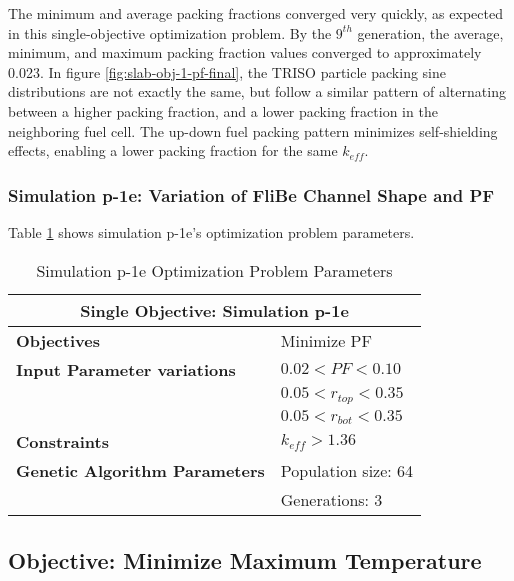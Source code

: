 The minimum and average packing fractions converged very quickly, as expected 
in this single-objective optimization problem.
By the $9^{th}$ generation, the average, minimum, and maximum packing fraction
values converged to approximately 0.023. 
In figure \ref{fig:slab-obj-1-pf-final}, the TRISO particle packing 
sine distributions are not exactly the same, but follow a similar pattern of 
alternating between a higher packing fraction, and a lower packing fraction 
in the neighboring fuel cell. 
The up-down fuel packing pattern minimizes self-shielding effects, enabling  
a lower packing fraction for the same $k_{eff}$. 

\subsubsection{Simulation p-1e: Variation of FliBe Channel Shape and PF}
Table \ref{tab:simulationp1e} shows simulation p-1e's optimization problem parameters. 
\begin{table}[htbp]
    \centering
    \onehalfspacing
    \caption{Simulation p-1e Optimization Problem Parameters}
	\label{tab:simulationp1e}
    \footnotesize
    \begin{tabular}{l|p{4cm}}
    \hline 
    \multicolumn{2}{c}{\textbf{Single Objective: Simulation p-1e}} \\
    \hline 
    \textbf{Objectives} & Minimize PF \\
    \hline 
    \textbf{Input Parameter variations} & $0.02<PF<0.10$ \\
    & $0.05<r_{top}<0.35$ \\
    & $0.05<r_{bot}<0.35$ \\
    \hline
    \textbf{Constraints} & $k_{eff} > 1.36$\\ 
    \hline 
    \textbf{Genetic Algorithm Parameters} & Population size: 64 \\
    & Generations: 3 \\
    \hline
    \end{tabular}
\end{table}

\subsection{Objective: Minimize Maximum Temperature}

